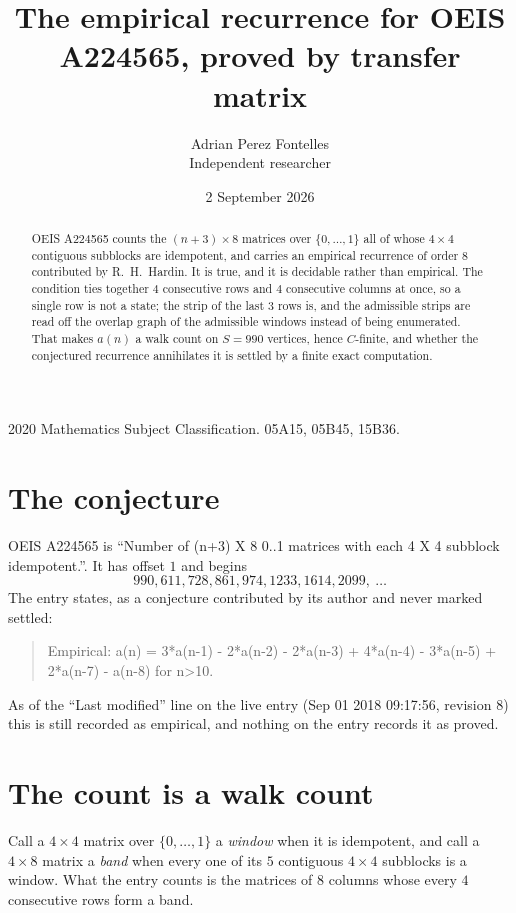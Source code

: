 \documentclass[11pt,a4paper]{article}
\title{The empirical recurrence for OEIS A224565, proved by transfer matrix}
\author{Adrian Perez Fontelles\\ \small Independent researcher}
\date{2 September 2026}
\theoremstyle{plain}
\theoremstyle{definition}
\begin{document}
\maketitle

\begin{abstract}
OEIS A224565 counts the $(n+3)\times8$ matrices over $\{0,\dots,1\}$ all of whose
$4\times4$ contiguous subblocks are idempotent, and carries an empirical recurrence of order
$8$ contributed by R.~H.~Hardin. It is true, and it is decidable rather than empirical.
The condition ties together $4$ consecutive rows and $4$ consecutive columns at once, so a
single row is not a state; the strip of the last $3$ rows is, and the admissible strips
are read off the overlap graph of the admissible windows instead of being enumerated. That
makes $a(n)$ a walk count on $S=990$ vertices, hence $C$-finite, and whether the conjectured
recurrence annihilates it is settled by a finite exact computation.
\end{abstract}

\noindent\small 2020 Mathematics Subject Classification. 05A15, 05B45, 15B36.\normalsize

\section{The conjecture}

OEIS A224565 is ``Number of (n+3) X 8 0..1 matrices with each 4 X 4 subblock idempotent.''. It has offset $1$ and begins
\[
990, 611, 728, 861, 974, 1233, 1614, 2099,\ \dots
\]
The entry states, as a conjecture contributed by its author and never marked settled:
\begin{quote}
Empirical: a(n) = 3*a(n-1) - 2*a(n-2) - 2*a(n-3) + 4*a(n-4) - 3*a(n-5) + 2*a(n-7) - a(n-8) for n>10.
\end{quote}
As of the ``Last modified'' line on the live entry (Sep 01 2018 09:17:56, revision 8) this is still
recorded as empirical, and nothing on the entry records it as proved.

\section{The count is a walk count}

Call a $4\times4$ matrix over $\{0,\dots,1\}$ a \emph{window} when it is idempotent, and
call a $4\times8$ matrix a \emph{band} when every one of its $5$ contiguous
$4\times4$ subblocks is a window. What the entry counts is the matrices of $8$ columns
whose every $4$ consecutive rows form a band.
\end{document}
